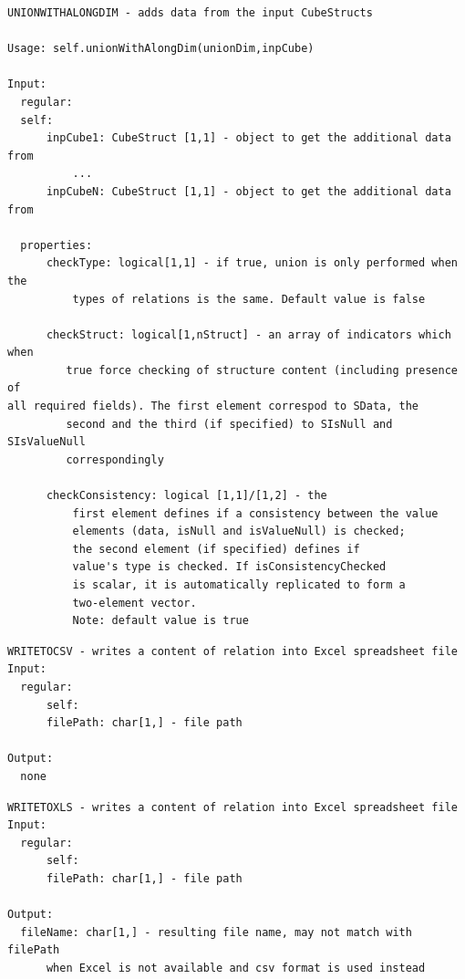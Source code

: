 \documentclass[letterpaper,10pt,english]{sphinxmanual}
\begin{document}
\begin{Verbatim}[commandchars=\\\{\}]
UNIONWITHALONGDIM - adds data from the input CubeStructs

Usage: self.unionWithAlongDim(unionDim,inpCube)

Input:
  regular:
  self:
      inpCube1: CubeStruct [1,1] - object to get the additional data from
          ...
      inpCubeN: CubeStruct [1,1] - object to get the additional data from

  properties:
      checkType: logical[1,1] - if true, union is only performed when the
          types of relations is the same. Default value is false

      checkStruct: logical[1,nStruct] - an array of indicators which when
         true force checking of structure content (including presence of
all required fields). The first element correspod to SData, the
         second and the third (if specified) to SIsNull and SIsValueNull
         correspondingly

      checkConsistency: logical [1,1]/[1,2] - the
          first element defines if a consistency between the value
          elements (data, isNull and isValueNull) is checked;
          the second element (if specified) defines if
          value's type is checked. If isConsistencyChecked
          is scalar, it is automatically replicated to form a
          two-element vector.
          Note: default value is true
\end{Verbatim}

\begin{Verbatim}[commandchars=\\\{\}]
WRITETOCSV - writes a content of relation into Excel spreadsheet file
Input:
  regular:
      self:
      filePath: char[1,] - file path

Output:
  none
\end{Verbatim}

\begin{Verbatim}[commandchars=\\\{\}]
WRITETOXLS - writes a content of relation into Excel spreadsheet file
Input:
  regular:
      self:
      filePath: char[1,] - file path

Output:
  fileName: char[1,] - resulting file name, may not match with filePath
      when Excel is not available and csv format is used instead
\end{Verbatim}
\end{document}
